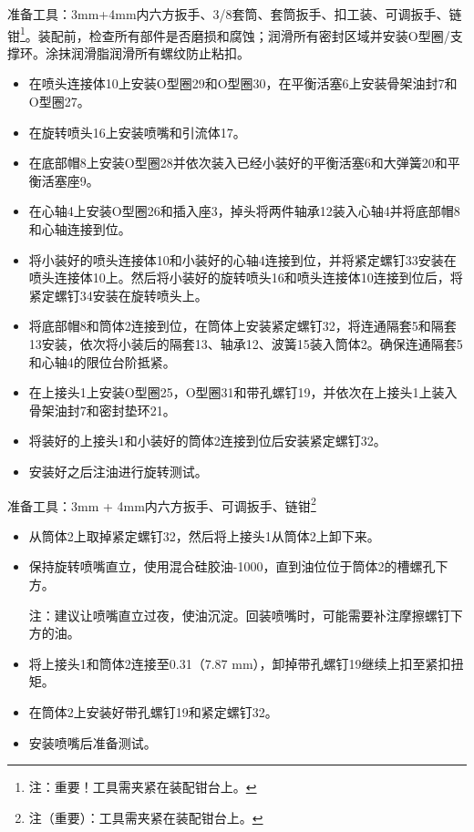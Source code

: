 准备工具：3mm+4mm内六方扳手、3/8\inch 套筒、套筒扳手、扣工装、可调扳手、链钳\footnote{注：重要！工具需夹紧在装配钳台上。}。装配前，检查所有部件是否磨损和腐蚀；润滑所有密封区域并安装O型圈/支撑环。涂抹润滑脂润滑所有螺纹防止粘扣。
\begin{itemize}
	\item 在喷头连接体10上安装O型圈29和O型圈30，在平衡活塞6上安装骨架油封7和O型圈27。
	
	\item 在旋转喷头16上安装喷嘴和引流体17。
	
	\item 在底部帽8上安装O型圈28并依次装入已经小装好的平衡活塞6和大弹簧20和平衡活塞座9。
	
	\item 在心轴4上安装O型圈26和插入座3，掉头将两件轴承12装入心轴4并将底部帽8和心轴连接到位。
	
	\item 将小装好的喷头连接体10和小装好的心轴4连接到位，并将紧定螺钉33安装在喷头连接体10上。然后将小装好的旋转喷头16和喷头连接体10连接到位后，将紧定螺钉34安装在旋转喷头上。
	
	\item 将底部帽8和筒体2连接到位，在筒体上安装紧定螺钉32，将连通隔套5和隔套13安装，依次将小装后的隔套13、轴承12、波簧15装入筒体2。确保连通隔套5和心轴4的限位台阶抵紧。
	
	\item 在上接头1上安装O型圈25，O型圈31和带孔螺钉19，并依次在上接头1上装入骨架油封7和密封垫环21。
	
	\item 将装好的上接头1和小装好的筒体2连接到位后安装紧定螺钉32。
	
	\item 安装好之后注油进行旋转测试。
\end{itemize}
	
	

准备工具：3mm + 4mm内六方扳手、可调扳手、链钳\footnote{
注（重要）：工具需夹紧在装配钳台上。}

\begin{itemize}

	\item 从筒体2上取掉紧定螺钉32，然后将上接头1从筒体2上卸下来。
	\item 保持旋转喷嘴直立，使用混合硅胶油-1000，直到油位位于筒体2的槽螺孔下方。
 
注：建议让喷嘴直立过夜，使油沉淀。回装喷嘴时，可能需要补注摩擦螺钉下方的油。

	\item 将上接头1和筒体2连接至0.31\inch（7.87 mm），卸掉带孔螺钉19继续上扣至紧扣扭矩。
	
	\item 在筒体2上安装好带孔螺钉19和紧定螺钉32。
 
	\item 安装喷嘴后准备测试。
	\end{itemize}
	
